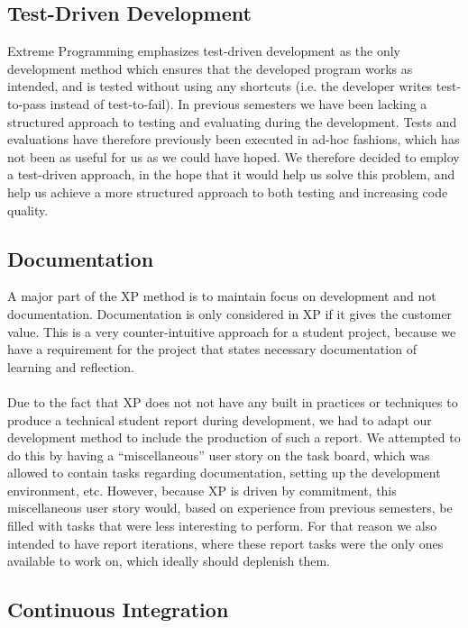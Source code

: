 \subsection{Test-Driven Development}
\label{sub:test_driven_development}
Extreme Programming emphasizes test-driven development as the only development method which ensures that the developed program works as intended, and is tested without using any shortcuts (i.e. the developer writes test-to-pass instead of test-to-fail). In previous semesters we have been lacking a structured approach to testing and evaluating during the development. Tests and evaluations have therefore previously been executed in ad-hoc fashions, which has not been as useful for us as we could have hoped. We therefore decided to employ a test-driven approach, in the hope that it would help us solve this problem, and help us achieve a more structured approach to both testing and increasing code quality.

\subsection{Documentation}
A major part of the XP method is to maintain focus on development and not documentation. Documentation is only considered in XP if it gives the customer value. This is a very counter-intuitive approach for a student project, because we have a requirement for the project that states necessary documentation of learning and reflection. 
\\\\
Due to the fact that XP does not not have any built in practices or techniques to produce a technical student report during development, we had to adapt our development method to include the production of such a report. We attempted to do this by having a ``miscellaneous'' user story on the task board, which was allowed to contain tasks regarding documentation, setting up the development environment, etc. However, because XP is driven by commitment, this miscellaneous user story would, based on experience from previous semesters, be filled with tasks that were less interesting to perform. For that reason we also intended to have report iterations, where these report tasks were the only ones available to work on, which ideally should deplenish them.

\subsection{Continuous Integration}
\label{sub:continuous_integration}

